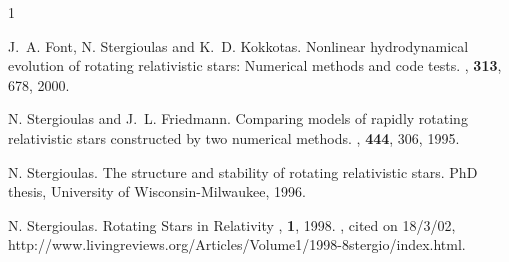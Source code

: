 \begin{thebibliography}{1}

J.~A. Font, N. Stergioulas and K.~D. Kokkotas.
\newblock Nonlinear hydrodynamical evolution of rotating relativistic
stars: Numerical methods and code tests.
, {\bf 313}, 678, 2000.

N. Stergioulas and J.~L. Friedmann.
\newblock Comparing models of rapidly rotating relativistic stars
constructed by two numerical methods.
, {\bf 444}, 306, 1995.

N. Stergioulas.
\newblock The structure and stability of rotating relativistic stars.
\newblock PhD thesis, University of Wisconsin-Milwaukee, 1996.

N. Stergioulas.
\newblock Rotating Stars in Relativity
, {\bf 1}, 1998.
, cited on 18/3/02,
  http://www.livingreviews.org/Articles/Volume1/1998-8stergio/index.html.

\end{thebibliography}



